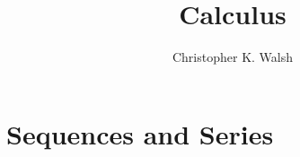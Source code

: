 \documentclass[12pt,openany]{book}
\title{Calculus}
\author{Christopher K. Walsh}
\theoremstyle{mydefinitionstyle}
\theoremstyle{myexamplestyle}
\theoremstyle{remark}
\begin{document}
\maketitle
\tableofcontents

\newpage

\chapter{Sequences and Series}


\end{document}
